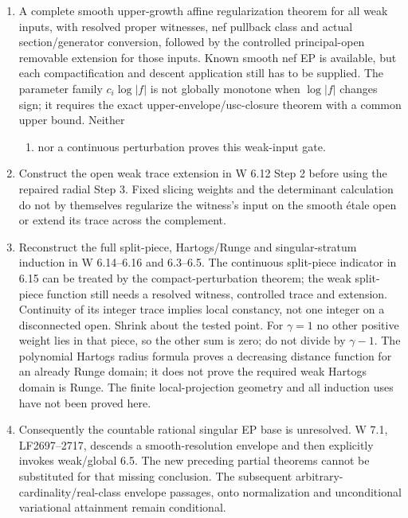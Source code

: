 \documentclass[
  11pt,
]{article}
\providecommand{\tightlist}{%
  \setlength{\itemsep}{0pt}\setlength{\parskip}{0pt}}
\begin{document}
\begin{enumerate}
\def\labelenumi{\arabic{enumi}.}
\tightlist
\item
  A complete smooth upper-growth affine regularization theorem for all
  weak inputs, with resolved proper witnesses, nef pullback class and
  actual section/generator conversion, followed by the controlled
  principal-open removable extension for those inputs. Known smooth nef
  EP is available, but each compactification and descent application
  still has to be supplied. The parameter family \(c_i\log|f|\) is not
  globally monotone when \(\log|f|\) changes sign; it requires the exact
  upper-envelope/usc-closure theorem with a common upper bound. Neither

  \begin{enumerate}
  \def\labelenumii{(\arabic{enumii})}
  \setcounter{enumii}{21}
  \tightlist
  \item
    nor a continuous perturbation proves this weak-input gate.
  \end{enumerate}
\item
  Construct the open weak trace extension in W 6.12 Step 2 before using
  the repaired radial Step 3. Fixed slicing weights and the determinant
  calculation do not by themselves regularize the witness's input on the
  smooth étale open or extend its trace across the complement.
\item
  Reconstruct the full split-piece, Hartogs/Runge and singular-stratum
  induction in W 6.14--6.16 and 6.3--6.5. The continuous split-piece
  indicator in 6.15 can be treated by the compact-perturbation theorem;
  the weak split-piece function still needs a resolved witness,
  controlled trace and extension. Continuity of its integer trace
  implies local constancy, not one integer on a disconnected open.
  Shrink about the tested point. For \(\gamma=1\) no other positive
  weight lies in that piece, so the other sum is zero; do not divide by
  \(\gamma-1\). The polynomial Hartogs radius formula proves a
  decreasing distance function for an already Runge domain; it does not
  prove the required weak Hartogs domain is Runge. The finite
  local-projection geometry and all induction uses have not been proved
  here.
\item
  Consequently the countable rational singular EP base is unresolved. W
  7.1, LF2697--2717, descends a smooth-resolution envelope and then
  explicitly invokes weak/global 6.5. The new preceding partial theorems
  cannot be substituted for that missing conclusion. The subsequent
  arbitrary-cardinality/real-class envelope passages, onto normalization
  and unconditional variational attainment remain conditional.
\end{enumerate}
\end{document}
